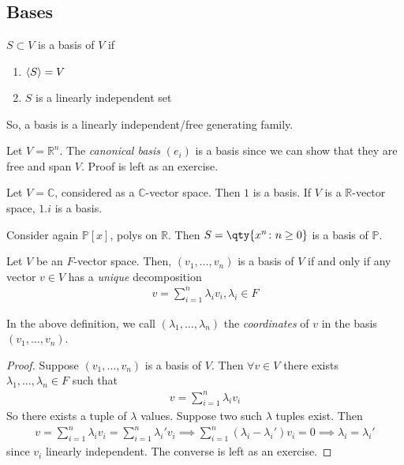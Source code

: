 \subsection{Bases}
\begin{definition}[Basis]
    $S \subset V$ is a basis of $V$ if
    \begin{enumerate}
        \item $\langle{} S \rangle = V$
        \item $S$ is a linearly independent set
    \end{enumerate}
    So, a basis is a linearly independent/free generating family.
\end{definition}
\begin{example}
    Let $V = \mathbb R^n$.
    The \textit{canonical basis} $(e_i)$ is a basis since we can show that they are free and span $V$.
    Proof is left as an exercise.
\end{example}
\begin{example}
    Let $V = \mathbb C$, considered as a $\mathbb C$-vector space.
    Then $\qty{1}$ is a basis.
    If $V$ is a $\mathbb R$-vector space, $\qty{1,i}$ is a basis.
\end{example}
\begin{example}
    Consider again $\mathbb P[x]$, polys on $\mathbb{R}$.
    Then $S = \qty{x^n \colon n \geq 0}$ is a basis of $\mathbb P$.
\end{example}

\begin{lemma}
    Let $V$ be an $F$-vector space.
    Then, $(v_1, \dots, v_n)$ is a basis of $V$ if and only if any vector $v \in V$ has a \textit{unique} decomposition
    \begin{align*}
        v = \sum_{i=1}^n \lambda_i v_i, \lambda_i \in F
    \end{align*}
\end{lemma}
\begin{remark}
    In the above definition, we call $(\lambda_1, \dots, \lambda_n)$ the \textit{coordinates} of $v$ in the basis $(v_1, \dots, v_n)$.
\end{remark}
\begin{proof}
    Suppose $(v_1, \dots, v_n)$ is a basis of $V$.
    Then $\forall v \in V$ there exists $\lambda_1, \dots, \lambda_n \in F$ such that
    \begin{align*}
        v = \sum_{i=1}^n \lambda_i v_i
    \end{align*}
    So there exists a tuple of $\lambda$ values.
    Suppose two such $\lambda$ tuples exist.
    Then
    \begin{align*}
        v = \sum_{i=1}^n \lambda_i v_i = \sum_{i=1}^n \lambda_i' v_i \implies \sum_{i=1}^n (\lambda_i - \lambda_i') v_i = 0 \implies \lambda_i = \lambda_i'
    \end{align*} since $v_i$ linearly independent.
    The converse is left as an exercise.
\end{proof}

